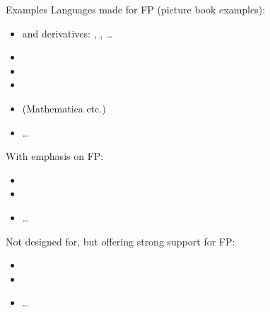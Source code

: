 \begin{frame}{Examples}
	Languages made for FP (picture book examples):
	\begin{itemize}
		\item {} and derivatives: , , \dots
		\item {}
		\item {}
		\item {}
		\item {} (Mathematica etc.)
		\item \dots
	\end{itemize}
	With emphasis on FP:
	\begin{itemize}
		\item {}
		\item {}
		\item \dots
	\end{itemize}
	Not designed for, but offering strong support for FP:
	\begin{itemize}
		\item {} 
		\item {}
		\item \dots
	\end{itemize}
\end{frame}

%	
%

